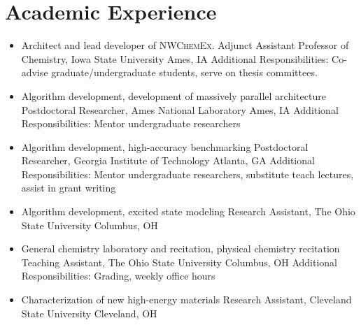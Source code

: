 \documentclass[11pt,a4paper,sans]{moderncv}
\begin{document}

\section{Academic Experience}
\vspace{5pt}
\begin{itemize}
	\item{
	         {Architect and lead developer of \textsc{NWChemEx}.}
	         {Adjunct Assistant Professor of Chemistry, Iowa State University}
	         {Ames, IA}
	         {}
	         {Additional Responsibilities: Co-advise graduate/undergraduate students, 
	           serve on thesis committees.}}
	\item{
		 {Algorithm development, development of massively parallel architecture}
		 {Postdoctoral Researcher, Ames National Laboratory}
		 {Ames, IA}
		 {}
		 {Additional Responsibilities: Mentor undergraduate researchers}}
	\item{
		  {Algorithm development, high-accuracy benchmarking}
		  {Postdoctoral Researcher, Georgia Institute of Technology}
		  {Atlanta, GA}
		  {}
		  {Additional Responsibilities: Mentor undergraduate researchers,
		  substitute teach lectures, assist in grant writing}}
	\item{
		 {Algorithm development, excited state modeling}
		 {Research Assistant, The Ohio State University}
		 {Columbus, OH}
		 {}
		 {}}
	\item{
		 {General chemistry laboratory and recitation, physical chemistry recitation}
		 {Teaching Assistant, The Ohio State University}
		 {Columbus, OH}
		 {}
		 {Additional Responsibilities: Grading, weekly office hours}}
	\item{
		{Characterization of new high-energy materials}
		{Research Assistant, Cleveland State University}
		{Cleveland, OH}
		{}
		{}}
\end{itemize}
\end{document}
